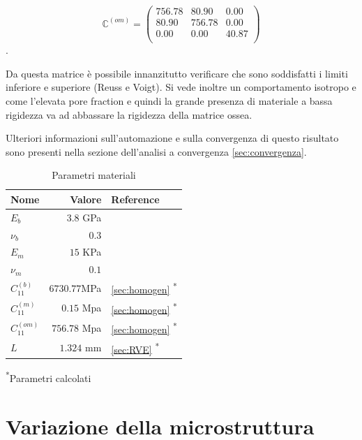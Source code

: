\documentclass[a4paper,num-refs]{oup-contemporary}
\begin{document}
\begin{equation}
\mathbb C^{(om)}=\left(
\begin{array}{ccc}
	756.78 & 80.90 & 0.00 \\
	80.90 & 756.78 & 0.00 \\
	0.00 & 0.00 & 40.87\\
\end{array}
\right)
\end{equation}.

Da questa matrice è possibile innanzitutto verificare che sono soddisfatti i limiti inferiore e superiore (Reuss e Voigt). 
Si vede inoltre un comportamento isotropo e come l'elevata pore fraction e quindi la grande presenza di materiale a bassa rigidezza va ad abbassare la rigidezza della matrice ossea. 

Ulteriori informazioni sull'automazione e sulla convergenza di questo risultato sono presenti nella sezione dell'analisi a convergenza \cref{sec:convergenza}.


\begin{table}[bt!]
	\caption{Parametri materiali}\label{tab:example}
	\begin{tabular}{l r l}
		\toprule
		Nome & Valore &  Reference\\
		\midrule
		$E_b$ & $3.8$ GPa & \citet{Cowin1}  \\
		$\nu_b$  & $0.3$ & \citet{Dalstra:93,Wirtz:2000}  \\
		$E_m$  & $15$ KPa  & \citet{Jansen:2015} \\ 
		$\nu_m$ & $0.1 $&    \\
		
		$C_{11}^{(b)}$&$6730.77 $MPa& \cref{sec:homogen} \textsuperscript{*}\\
		$C_{11}^{(m)}$& $0.15$ Mpa& \cref{sec:homogen} \textsuperscript{*}\\
		$C_{11}^{(om)}$& $756.78 $ Mpa & \cref{sec:homogen} \textsuperscript{*}\\
		$L$ & $1.324$ mm& \cref{sec:RVE} \textsuperscript{*}\\
		\bottomrule
	\end{tabular}
	\begin{tablenotes}
		
		\item \textsuperscript{*}Parametri calcolati
	\end{tablenotes}
\end{table}


\section{Variazione della microstruttura}
\end{document}
